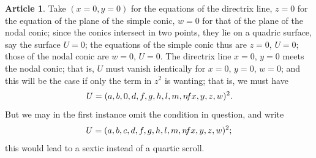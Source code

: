 \documentclass[12pt,a4paper]{article}
\theoremstyle{definition}
\newtheorem{art}{Article}[section]
\begin{document}
\begin{art}
Take $(x = 0, y = 0)$ for the equations of the directrix line, $z = 0$ for the equation of the plane of the simple conic, $w = 0$ for that of the plane of the nodal conic; since the conics intersect in two points, they lie on a quadric surface, say the surface $U = 0$; the equations of the simple conic thus are $z = 0$, $U = 0$; those of the nodal conic are $w = 0$, $U = 0$. The directrix line $x = 0$, $y = 0$ meets the nodal conic; that is, $U$ must vanish identically for $x = 0$, $y = 0$, $w = 0$; and this will be the case if only the term in $z^2$ is wanting; that is, we must have
\[
U = (a, b, 0, d, f, g, h, l, m, n \hspace{-2pt} fx, y, z, w)^2.
\]
But we may in the first instance omit the condition in question, and write
\[
U = (a, b, c, d, f, g, h, l, m, n \hspace{-2pt} fx, y, z, w)^2;
\]
this would lead to a sextic instead of a quartic scroll.
\end{art}
\end{document}
